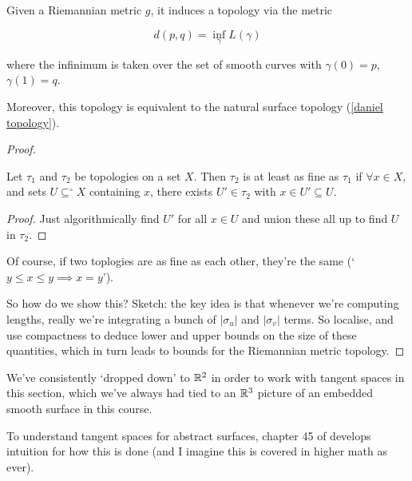 \documentclass[11pt]{scrartcl}
\begin{document}
\begin{proposition}

Given a Riemannian metric $g$, it induces a topology via the metric

\begin{equation}
    d(p, q) = \inf_\gamma L(\gamma)
\end{equation}

where the infinimum is taken over the set of smooth curves with $\gamma(0)=p$, $\gamma(1)=q$.

Moreover, this topology is equivalent to the natural surface topology (\ref{daniel topology}).

\begin{proof}

\begin{lemma}
Let $\tau_1$ and $\tau_2$ be topologies on a set $X$. Then $\tau_2$ is at least as fine as $\tau_1$ if $\forall x \in X$, and sets $U \subseteq^\circ X$ containing $x$, there exists $U' \in \tau_2$ with $x \in U' \subseteq U$.

\begin{proof}
Just algorithmically find $U'$ for all $x \in U$ and union these all up to find $U$ in $\tau_2$.
\end{proof}
\end{lemma}

Of course, if two toplogies are as fine as each other, they're the same (`$y \le x \le y \implies x=y$').

So how do we show this? Sketch: the key idea is that whenever we're computing lengths, really we're integrating a bunch of $|\sigma_u|$ and $|\sigma_v|$ terms. So localise, and use compactness to deduce lower and upper bounds on the size of these quantities, which in turn leads to bounds for the Riemannian metric topology.
\end{proof}
\end{proposition}

\begin{remark}
We've consistently `dropped down' to $\mathbb R^2$ in order to work with tangent spaces in this section, which we've always had tied to an $\mathbb R^3$ picture of an embedded smooth surface in this course.

To understand tangent spaces for abstract surfaces, chapter 45 of \cite{Napkin} develops intuition for how this is done (and I imagine this is covered in higher math as ever).
\end{remark}
\end{document}
